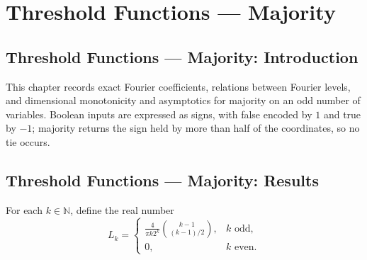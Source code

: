 \section{Threshold Functions --- Majority}
\subsection*{Threshold Functions --- Majority: Introduction}

This chapter records exact Fourier coefficients, relations between Fourier levels,
and dimensional monotonicity and asymptotics for majority on an odd number of variables.
Boolean inputs are expressed as signs, with false encoded by $1$ and true by $-1$;
majority returns the sign held by more than half of the coordinates, so no tie occurs.

\subsection*{Threshold Functions --- Majority: Results}

\begin{definition}
\leanok
{}
For each $k\in\mathbb N$, define the real number
\[
 L_k=\begin{cases}
 \displaystyle\frac{4}{\pi k2^k}\binom{k-1}{(k-1)/2},& k\text{ odd},\\
 0,& k\text{ even}.
 \end{cases}
\]
\end{definition}

